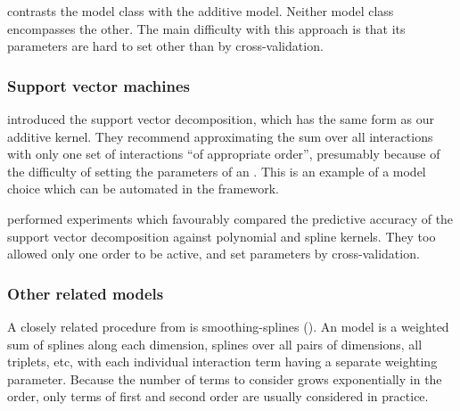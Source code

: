  contrasts the \HKL{} model class with the additive \gp{} model.
Neither model class encompasses the other.
The main difficulty with this approach is that its parameters are hard to set other than by cross-validation.



\subsubsection{Support vector machines}

\citet{vapnik1998statistical} introduced the support vector \ANOVA{} decomposition, which has the same form as our additive kernel.
They recommend approximating the sum over all interactions with only one set of interactions ``of appropriate order'', presumably because of the difficulty of setting the parameters of an \SVM{}.
This is an example of a model choice which can be automated in the \gp{} framework.

\citet{stitson1999support} performed experiments which favourably compared the predictive accuracy of the support vector \ANOVA{} decomposition against polynomial and spline kernels.
They too allowed only one order to be active, and set parameters by cross-validation.
%

\subsubsection{Other related models}

A closely related procedure from \citet{wahba1990spline} is smoothing-splines \ANOVA{} (\SSANOVA{}).
An \SSANOVA{} model is a weighted sum of splines along each dimension, splines over all pairs of dimensions, all triplets, etc, with each individual interaction term having a separate weighting parameter.
Because the number of terms to consider grows exponentially in the order, only terms of first and second order are usually considered in practice.



